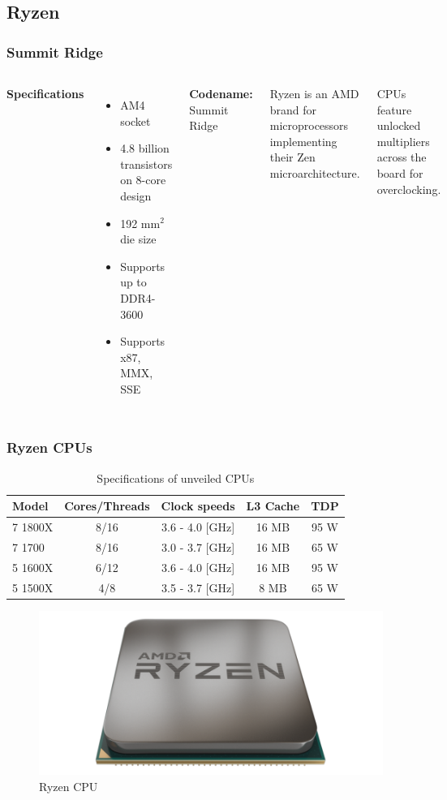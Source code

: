 \documentclass{beamer}
\begin{document}
	\subsection{Ryzen}	
	\begin{frame}
		\frametitle{Summit Ridge}
		\begin{columns}[c]			
			\textbf{Specifications}
			\begin{itemize}
				\item AM4 socket
				\item 4.8 billion transistors on 8-core design
				\item 192 mm$^2$ die size
				\item Supports up to DDR4-3600
				\item Supports x87, MMX, SSE
			\end{itemize}			
			\textbf{Codename:}
			Summit Ridge \bigskip
						
			Ryzen is an AMD brand for microprocessors implementing their Zen microarchitecture.
			
			CPUs feature unlocked multipliers across the board for overclocking.			
		\end{columns}
	\end{frame}	
	\begin{frame}
		\frametitle{Ryzen CPUs}
		\begin{table}			
			\begin{tabular}{l c c c c}
				\toprule
				\textbf{Model} & \textbf{Cores/Threads} & \textbf{Clock speeds} & \textbf{L3 Cache} & \textbf{TDP}\\
				\midrule
				7 1800X & 8/16 & 3.6 - 4.0 [GHz] & 16 MB & 95 W\\
				7 1700 & 8/16 & 3.0 - 3.7 [GHz] & 16 MB & 65 W\\
				5 1600X & 6/12 & 3.6 - 4.0 [GHz] & 16 MB & 95 W\\
				5 1500X & 4/8 & 3.5 - 3.7 [GHz] & 8 MB & 65 W\\
				\bottomrule
			\end{tabular}
			\caption{Specifications of unveiled CPUs}
		\end{table}	
		\begin{figure}[p]
			\includegraphics[width=.4\textwidth]{ryzen.png}
			\caption{Ryzen CPU}
		\end{figure}
	\end{frame}	
\end{document}
